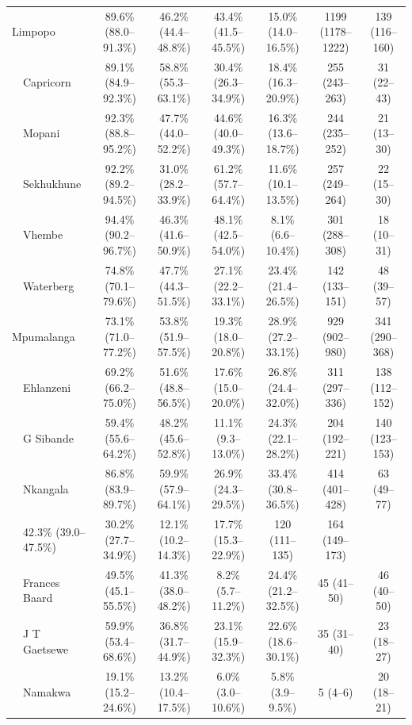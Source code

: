 \documentclass{article}
\begin{document}
\begin{landscape}
{\begin{longtable}[c]{llc cc ccc}
      \multicolumn{2}{l}{Limpopo} & 89.6\% (88.0--91.3\%) & 46.2\% (44.4--48.8\%) & 43.4\% (41.5--45.5\%) & 15.0\% (14.0--16.5\%) & 1199 (1178--1222) & 139 (116--160) \\
      & Capricorn & 89.1\% (84.9--92.3\%) & 58.8\% (55.3--63.1\%) & 30.4\% (26.3--34.9\%) & 18.4\% (16.3--20.9\%) & 255 (243--263) & 31 (22--43) \\
      & Mopani & 92.3\% (88.8--95.2\%) & 47.7\% (44.0--52.2\%) & 44.6\% (40.0--49.3\%) & 16.3\% (13.6--18.7\%) & 244 (235--252) & 21 (13--30) \\
      & Sekhukhune & 92.2\% (89.2--94.5\%) & 31.0\% (28.2--33.9\%) & 61.2\% (57.7--64.4\%) & 11.6\% (10.1--13.5\%) & 257 (249--264) & 22 (15--30) \\
      & Vhembe & 94.4\% (90.2--96.7\%) & 46.3\% (41.6--50.9\%) & 48.1\% (42.5--54.0\%) & 8.1\% (6.6--10.4\%) & 301 (288--308) & 18 (10--31) \\
      & Waterberg & 74.8\% (70.1--79.6\%) & 47.7\% (44.3--51.5\%) & 27.1\% (22.2--33.1\%) & 23.4\% (21.4--26.5\%) & 142 (133--151) & 48 (39--57) \\[5pt]
      \multicolumn{2}{l}{Mpumalanga} & 73.1\% (71.0--77.2\%) & 53.8\% (51.9--57.5\%) & 19.3\% (18.0--20.8\%) & 28.9\% (27.2--33.1\%) & 929 (902--980) & 341 (290--368) \\
      & Ehlanzeni & 69.2\% (66.2--75.0\%) & 51.6\% (48.8--56.5\%) & 17.6\% (15.0--20.0\%) & 26.8\% (24.4--32.0\%) & 311 (297--336) & 138 (112--152) \\
      & G Sibande & 59.4\% (55.6--64.2\%) & 48.2\% (45.6--52.8\%) & 11.1\% (9.3--13.0\%) & 24.3\% (22.1--28.2\%) & 204 (192--221) & 140 (123--153) \\
      & Nkangala & 86.8\% (83.9--89.7\%) & 59.9\% (57.9--64.1\%) & 26.9\% (24.3--29.5\%) & 33.4\% (30.8--36.5\%) & 414 (401--428) & 63 (49--77) \\
      \pagebreak
      \multicolumn{2}{l}{Northern Cape} & 42.3\% (39.0--47.5\%) & 30.2\% (27.7--34.9\%) & 12.1\% (10.2--14.3\%) & 17.7\% (15.3--22.9\%) & 120 (111--135) & 164 (149--173) \\
      & Frances Baard & 49.5\% (45.1--55.5\%) & 41.3\% (38.0--48.2\%) & 8.2\% (5.7--11.2\%) & 24.4\% (21.2--32.5\%) & 45 (41--50) & 46 (40--50) \\
      & J T Gaetsewe & 59.9\% (53.4--68.6\%) & 36.8\% (31.7--44.9\%) & 23.1\% (15.9--32.3\%) & 22.6\% (18.6--30.1\%) & 35 (31--40) & 23 (18--27) \\
      & Namakwa & 19.1\% (15.2--24.6\%) & 13.2\% (10.4--17.5\%) & 6.0\% (3.0--10.6\%) & 5.8\% (3.9--9.5\%) & 5 (4--6) & 20 (18--21) \\

\end{longtable}}
\end{landscape}
\end{document}
